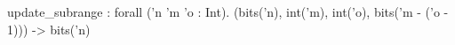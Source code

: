 update_subrange : forall ('n 'm 'o : Int). (bits('n), int('m), int('o), bits('m - ('o - 1))) -> bits('n)